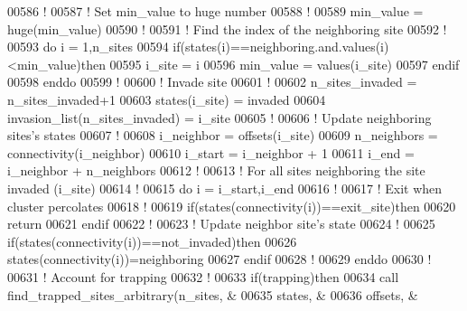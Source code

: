 \begin{DoxyCode}
00586        \textcolor{comment}{!}
00587        \textcolor{comment}{! Set min\_value to huge number}
00588        \textcolor{comment}{!}
00589        min\_value = huge(min\_value)
00590        \textcolor{comment}{!}
00591        \textcolor{comment}{! Find the index of the neighboring site}
00592        \textcolor{comment}{!}
00593        \textcolor{keyword}{do} i = 1,n\_sites
00594           \textcolor{keyword}{if}(states(i)==neighboring.and.values(i)<min\_value)\textcolor{keyword}{then}
00595              i\_site = i
00596              min\_value = values(i\_site)
00597           \textcolor{keyword}{endif}
00598        \textcolor{keyword}{enddo}
00599        \textcolor{comment}{!}
00600        \textcolor{comment}{! Invade site }
00601        \textcolor{comment}{!}
00602        n\_sites\_invaded = n\_sites\_invaded+1
00603        states(i\_site) = invaded
00604        invasion\_list(n\_sites\_invaded) = i\_site
00605        \textcolor{comment}{!}
00606        \textcolor{comment}{! Update neighboring sites's states }
00607        \textcolor{comment}{!}
00608        i\_neighbor = offsets(i\_site)
00609        n\_neighbors = connectivity(i\_neighbor)
00610        i\_start = i\_neighbor + 1
00611        i\_end   = i\_neighbor + n\_neighbors
00612        \textcolor{comment}{!}
00613        \textcolor{comment}{! For all sites neighboring the site invaded (i\_site)}
00614        \textcolor{comment}{!}
00615        \textcolor{keyword}{do} i = i\_start,i\_end
00616           \textcolor{comment}{!}
00617           \textcolor{comment}{! Exit when cluster percolates}
00618           \textcolor{comment}{!}
00619           \textcolor{keyword}{if}(states(connectivity(i))==exit\_site)\textcolor{keyword}{then}
00620              return
00621           \textcolor{keyword}{endif}
00622           \textcolor{comment}{!}
00623           \textcolor{comment}{! Update neighbor site's state}
00624           \textcolor{comment}{!}
00625           \textcolor{keyword}{if}(states(connectivity(i))==not\_invaded)\textcolor{keyword}{then}
00626              states(connectivity(i))=neighboring
00627           \textcolor{keyword}{endif}
00628           \textcolor{comment}{!}
00629        \textcolor{keyword}{enddo}
00630        \textcolor{comment}{!}
00631        \textcolor{comment}{! Account for trapping }
00632        \textcolor{comment}{!}
00633        \textcolor{keyword}{if}(trapping)\textcolor{keyword}{then}
00634           call find\_trapped\_sites\_arbitrary(n\_sites,           &
00635                                             states,            &
00636                                             offsets,           &

\end{DoxyCode}

